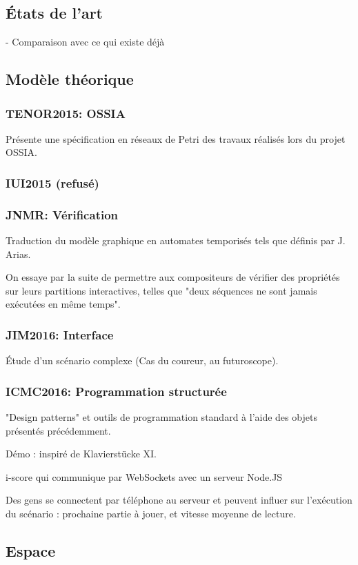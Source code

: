 \documentclass[french,a4paper,openany,12pt]{book}
\begin{document}
\subsection{États de l'art}
- Comparaison avec ce qui existe déjà

\subsection{Modèle théorique}
\subsubsection{TENOR2015: OSSIA}
Présente une spécification en réseaux de Petri des travaux réalisés 
lors du projet OSSIA.

\subsubsection{IUI2015 (refusé)}
\subsubsection{JNMR: Vérification}
Traduction du modèle graphique en automates temporisés tels que définis par J. Arias.

On essaye par la suite de permettre aux compositeurs de vérifier des propriétés 
sur leurs partitions interactives, telles que "deux séquences ne sont jamais exécutées en même temps".

\subsubsection{JIM2016: Interface}
Étude d'un scénario complexe (Cas du coureur, au futuroscope).

\subsubsection{ICMC2016: Programmation structurée}
"Design patterns" et outils de programmation standard à l'aide des objets présentés précédemment.

Démo : inspiré de Klavierstücke XI.

i-score qui communique par WebSockets avec un serveur Node.JS

Des gens se connectent par téléphone au serveur et peuvent influer sur 
l'exécution du scénario : prochaine partie à jouer, et vitesse moyenne de lecture.

\subsection{Espace}
\end{document}
